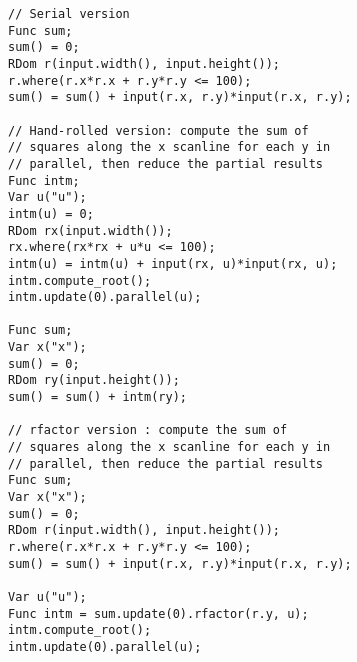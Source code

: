 \begin{lstlisting}[caption={Sum of squares reduction over a circular reduction domain with radius of 10: serial vs. parallel hand-rolled vs. parallel rfactor}, label={lst:circular_sum}]
// Serial version
Func sum;
sum() = 0;
RDom r(input.width(), input.height());
r.where(r.x*r.x + r.y*r.y <= 100);
sum() = sum() + input(r.x, r.y)*input(r.x, r.y);

// Hand-rolled version: compute the sum of  
// squares along the x scanline for each y in 
// parallel, then reduce the partial results
Func intm;
Var u("u");
intm(u) = 0;
RDom rx(input.width());
rx.where(rx*rx + u*u <= 100);
intm(u) = intm(u) + input(rx, u)*input(rx, u);
intm.compute_root();
intm.update(0).parallel(u);

Func sum;
Var x("x");
sum() = 0;
RDom ry(input.height());
sum() = sum() + intm(ry);

// rfactor version : compute the sum of 
// squares along the x scanline for each y in  
// parallel, then reduce the partial results
Func sum;
Var x("x");
sum() = 0;
RDom r(input.width(), input.height());
r.where(r.x*r.x + r.y*r.y <= 100);
sum() = sum() + input(r.x, r.y)*input(r.x, r.y);

Var u("u");
Func intm = sum.update(0).rfactor(r.y, u);
intm.compute_root();
intm.update(0).parallel(u);
\end{lstlisting}
